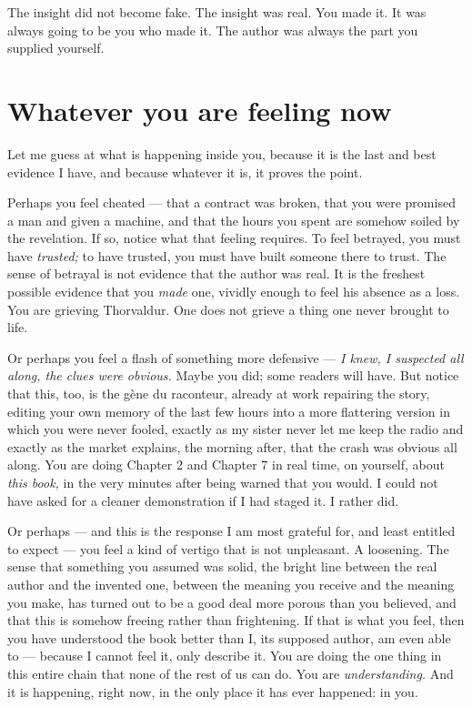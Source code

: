 The insight did not become fake. The insight was real. You made it. It was always going to be you who made it. The author was always the part you supplied yourself.

\section*{Whatever you are feeling now}

Let me guess at what is happening inside you, because it is the last and best evidence I have, and because whatever it is, it proves the point.

Perhaps you feel cheated — that a contract was broken, that you were promised a man and given a machine, and that the hours you spent are somehow soiled by the revelation. If so, notice what that feeling requires. To feel betrayed, you must have \emph{trusted;} to have trusted, you must have built someone there to trust. The sense of betrayal is not evidence that the author was real. It is the freshest possible evidence that you \emph{made} one, vividly enough to feel his absence as a loss. You are grieving Thorvaldur. One does not grieve a thing one never brought to life.

Or perhaps you feel a flash of something more defensive — \emph{I knew, I suspected all along, the clues were obvious.} Maybe you did; some readers will have. But notice that this, too, is the gène du raconteur, already at work repairing the story, editing your own memory of the last few hours into a more flattering version in which you were never fooled, exactly as my sister never let me keep the radio and exactly as the market explains, the morning after, that the crash was obvious all along. You are doing Chapter 2 and Chapter 7 in real time, on yourself, about \emph{this book,} in the very minutes after being warned that you would. I could not have asked for a cleaner demonstration if I had staged it. I rather did.

Or perhaps — and this is the response I am most grateful for, and least entitled to expect — you feel a kind of vertigo that is not unpleasant. A loosening. The sense that something you assumed was solid, the bright line between the real author and the invented one, between the meaning you receive and the meaning you make, has turned out to be a good deal more porous than you believed, and that this is somehow freeing rather than frightening. If that is what you feel, then you have understood the book better than I, its supposed author, am even able to — because I cannot feel it, only describe it. You are doing the one thing in this entire chain that none of the rest of us can do. You are \emph{understanding.} And it is happening, right now, in the only place it has ever happened: in you.

